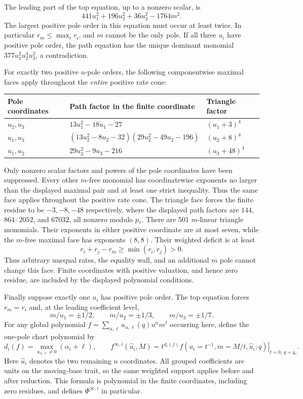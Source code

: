 \documentclass[11pt,a4paper]{article}
\theoremstyle{remark}\newtheorem{remark}[theorem]{Remark}
\begin{document}
The leading part of the top equation, up to a nonzero scalar, is
\[
 441u_1^2+196u_2^2+36u_3^2-1764m^2.
\]
The largest positive pole order in this equation must occur at least
twice. In particular $r_m\le\max_i r_i$, and $m$ cannot be the only
pole. If all three $u_i$ have positive pole order, the path equation has
the unique dominant monomial $377u_1^2u_2^4u_3^2$, a contradiction.

For exactly two positive $u$-pole orders, the following componentwise
maximal faces apply throughout the \emph{entire} positive rate cone:
\begin{center}\small
\begin{tabular}{@{}lll@{}}\toprule
Pole coordinates & Path factor in the finite coordinate & Triangle factor\\\midrule
$u_2,u_3$ &$13u_1^2-18u_1-27$&$(u_1+3)^4$\\
$u_1,u_3$ &$(13u_2^2-8u_2-32)(29u_2^2-49u_2-196)$&$(u_2+8)^4$\\
$u_1,u_2$ &$29u_3^2-9u_3-216$&$(u_3+48)^4$\\
\bottomrule\end{tabular}
\end{center}
Only nonzero scalar factors and powers of the pole coordinates have
been suppressed. Every other $m$-free monomial has coordinatewise exponents no larger
than the displayed maximal pair and at least one strict inequality.
Thus the same face applies throughout the positive rate cone.
The triangle face forces the finite residue to be
$-3,-8,-48$ respectively, where the displayed path factors are
$144$, $864\cdot2052$, and $67032$, all nonzero modulo $p_*$.
There are 501 $m$-linear triangle monomials. Their exponents in either
positive coordinate are at most seven, while the $m$-free maximal
face has exponents $(8,8)$. Their weighted deficit is at least
\[
 r_i+r_j-r_m\ge\min(r_i,r_j)>0.
\]
Thus arbitrary unequal rates, the equality wall, and an additional
$m$ pole cannot change this face. Finite coordinates with positive
valuation, and hence zero residue, are included by the displayed
polynomial conditions.

Finally suppose exactly one $u_i$ has positive pole order. The top
equation forces $r_m=r_i$ and, at the leading coefficient level,
\[
 m/u_1=\pm1/2,\qquad m/u_2=\pm1/3,\qquad m/u_3=\pm1/7.
\]
For any global polynomial
$f=\sum_{\alpha,\ell}a_{\alpha,\ell}(q)u^\alpha m^\ell$ occurring here,
define the one-pole chart polynomial by
\[
 d_i(f)=\max_{a_{\alpha,\ell}\ne0}(\alpha_i+\ell),\qquad
 f^{\infty,i}(\widehat u_i,M)=
 \left.t^{d_i(f)}f(u_i=t^{-1},m=M/t,\widehat u_i;q)
 \right|_{t=0,\,q=q_*}.
\]
Here $\widehat u_i$ denotes the two remaining $u$ coordinates. All grouped
coefficients are units on the moving-base trait, so the same weighted
support applies before and after reduction. This formula is polynomial
in the finite coordinates, including zero residues, and defines
$\Phi^{\infty,i}$ in particular.
\end{document}
